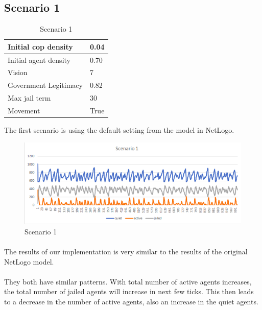 \documentclass[11pt]{article}
\begin{document}
    \subsection{Scenario 1}
     \begin{table}[ht]
        \begin{center}
          \begin{tabular}{|l|l|}
          \hline
            Initial cop density & 0.04 \\
          \hline
            Initial agent density & 0.70 \\
          \hline
            Vision & 7 \\
          \hline
            Government Legitimacy & 0.82 \\
          \hline
            Max jail term & 30 \\
          \hline
            Movement & True \\
          \hline
          \end{tabular}
          \caption{Scenario 1}\label{table1}
        \end{center}
      \end{table}
      The first scenario is using the default setting from the model in 
      NetLogo.
      \begin{figure}[h!]
        \includegraphics[width=\linewidth]{Scenario_1.png}
        \caption{Scenario 1}
        \label{fig:scenario}
      \end{figure}

      \paragraph{}
      The results of our implementation is very similar to the results of the
      original NetLogo model. 
      \paragraph{}
      They both have similar patterns. With total number
      of active agents increases, the total number of jailed agents will increase
      in next few ticks. This then leads to a decrease in the number of active agents,
      also an increase in the quiet agents. 
\end{document}
